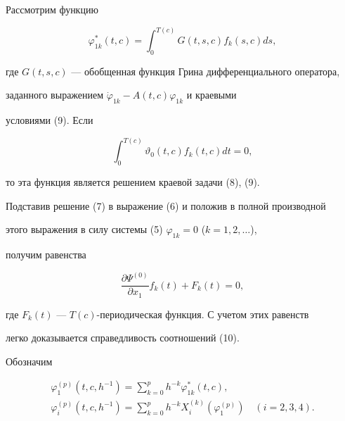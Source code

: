  


Рассмотрим функцию 


$$ 


\varphi^*_{1k}(t,c)=\int^{T(c)}_0 G(t,s,c)f_k(s,c)ds, 


$$ 


где $G(t,s,c)$ --- обобщенная функция Грина дифференциального оператора, 


заданного выражением $\Dot\varphi_{1k}-A(t,c)\varphi_{1k}$ и краевыми 


условиями (9). Если 


\begin{equation} 


\int^{T(c)}_0\vartheta_0(t,c)f_k(t,c)dt=0, 


\end{equation} 


то эта функция является решением краевой задачи (8), (9). 


 


Подставив решение (7) в выражение (6) и положив в полной производной 


этого выражения в силу системы (5) $\varphi_{1k}=0$ ($k=1,2,\dotsc$), 


получим равенства 


$$ 


\frac{\partial\Psi^{(0)}}{\partial x_1}f_k(t)+F_k(t)=0, 


$$ 


где $F_k(t)$ --- $T(c)$-периодическая функция. С учетом этих равенств 


легко доказывается справедливость соотношений (10). 


 


Обозначим 


\begin{gather*} 


\varphi^{(p)}_1(t,c,h^{-1})=\sum^p_{k=0}h^{-k} 


\varphi^*_{1k}(t,c),\\ 


\varphi^{(p)}_i(t,c,h^{-1})=\sum^p_{k=0}h^{-k} 


X^{(k)}_i(\varphi^{(p)}_1)\quad (i=2,3,4). 


\end{gather*} 


 


